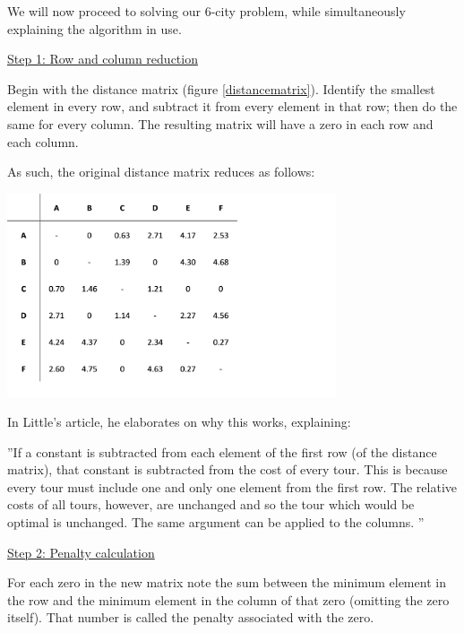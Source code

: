 \vspace{5mm}

We will now proceed to solving our 6-city problem, while simultaneously explaining the algorithm in use.

\vspace{5mm}

\underline{Step 1: Row and column reduction}
\vspace{1mm}

Begin with the distance matrix (figure \ref{distancematrix}). Identify the smallest element in every row, and subtract it from every element in that row; then do the same for every column. The resulting matrix will have a zero in each row and each column.

\vspace{5mm}

As such, the original distance matrix reduces as follows:
\vspace{3mm}

	\includegraphics[height=6cm]{dmreduced}
	
	
In Little’s article, he elaborates on why this works, explaining:
\vspace{-1mm}

\begin{displayquote} 
''If a constant is subtracted from each element of the first row (of the distance matrix), that constant is subtracted from the cost of every tour. This is because every tour must include one and only one element from the first row. The relative costs of all tours, however, are unchanged and so the tour which would be optimal is unchanged. The same argument can be applied to the columns.	''
\end{displayquote}
	
	
\underline{Step 2: Penalty calculation}	
\vspace{1mm}
	
For each zero in the new matrix note the sum between the minimum element in the row and the minimum element in the column of that zero (omitting the zero itself). That number is called the penalty associated with the zero.

